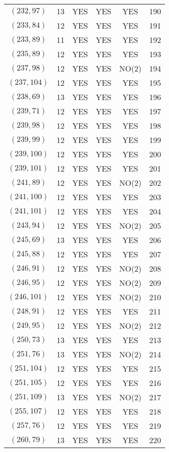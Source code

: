 \begin{longtable}{|c|c|c|c|c|c|}
$(232, 97)$ & 13 & YES & YES & YES & 190\\
$(233, 84)$ & 12 & YES & YES & YES & 191\\
$(233, 89)$ & 11 & YES & YES & YES & 192\\
$(235, 89)$ & 12 & YES & YES & YES & 193\\
$(237, 98)$ & 12 & YES & YES & NO(2) & 194\\
$(237, 104)$ & 12 & YES & YES & YES & 195\\
$(238, 69)$ & 13 & YES & YES & YES & 196\\
$(239, 71)$ & 12 & YES & YES & YES & 197\\
$(239, 98)$ & 12 & YES & YES & YES & 198\\
$(239, 99)$ & 12 & YES & YES & YES & 199\\
$(239, 100)$ & 12 & YES & YES & YES & 200\\
$(239, 101)$ & 12 & YES & YES & YES & 201\\
$(241, 89)$ & 12 & YES & YES & NO(2) & 202\\
$(241, 100)$ & 12 & YES & YES & YES & 203\\
$(241, 101)$ & 12 & YES & YES & YES & 204\\
$(243, 94)$ & 12 & YES & YES & NO(2) & 205\\
$(245, 69)$ & 13 & YES & YES & YES & 206\\
$(245, 88)$ & 12 & YES & YES & YES & 207\\
$(246, 91)$ & 12 & YES & YES & NO(2) & 208\\
$(246, 95)$ & 12 & YES & YES & NO(2) & 209\\
$(246, 101)$ & 12 & YES & YES & NO(2) & 210\\
$(248, 91)$ & 12 & YES & YES & YES & 211\\
$(249, 95)$ & 12 & YES & YES & NO(2) & 212\\
$(250, 73)$ & 13 & YES & YES & YES & 213\\
$(251, 76)$ & 13 & YES & YES & NO(2) & 214\\
$(251, 104)$ & 12 & YES & YES & YES & 215\\
$(251, 105)$ & 12 & YES & YES & YES & 216\\
$(251, 109)$ & 13 & YES & YES & NO(2) & 217\\
$(255, 107)$ & 12 & YES & YES & YES & 218\\
$(257, 76)$ & 12 & YES & YES & YES & 219\\
$(260, 79)$ & 13 & YES & YES & YES & 220\\

\end{longtable}
